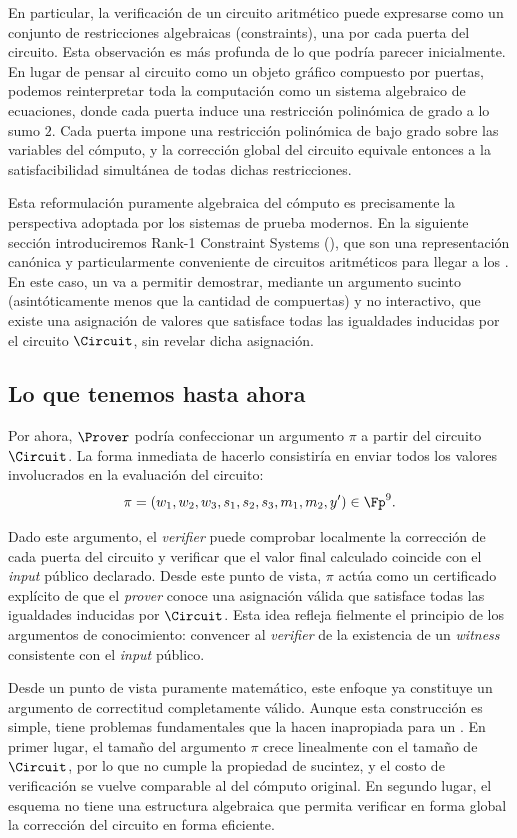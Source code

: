 En particular, la verificación de un circuito aritmético puede expresarse como un conjunto de restricciones algebraicas (constraints), una por cada puerta del circuito. Esta observación es más profunda de lo que podría parecer inicialmente. En lugar de pensar al circuito como un objeto gráfico compuesto por puertas, podemos reinterpretar toda la computación como un sistema algebraico de ecuaciones, donde cada puerta induce una restricción polinómica de grado a lo sumo $2$. Cada puerta impone una restricción polinómica de bajo grado sobre las variables del cómputo, y la corrección global del circuito equivale entonces a la satisfacibilidad simultánea de todas dichas restricciones.

Esta reformulación puramente algebraica del cómputo es precisamente la perspectiva adoptada por los sistemas de prueba modernos. En la siguiente sección introduciremos Rank-1 Constraint Systems (\ROneCS), que son una representación canónica y particularmente conveniente de circuitos aritméticos para llegar a los \SNARK. En este caso, un \SNARK va a permitir demostrar, mediante un argumento sucinto (asintóticamente menos que la cantidad de compuertas) y no interactivo, que existe una asignación de valores que satisface todas las igualdades inducidas por el circuito $\Circuit$, sin revelar dicha asignación.

\subsection{Lo que tenemos hasta ahora}

Por ahora, $\Prover$ podría confeccionar un argumento $\pi$ a partir del circuito $\Circuit$. La forma inmediata de hacerlo consistiría en enviar todos los valores involucrados en la evaluación del circuito:
$$\pi = (w_1, w_2, w_3, s_1, s_2, s_3, m_1, m_2, y') \in \Fp^9.$$

Dado este argumento, el \textit{verifier} puede comprobar localmente la corrección de cada puerta del circuito y verificar que el valor final calculado coincide con el \textit{input} público declarado. Desde este punto de vista, $\pi$ actúa como un certificado explícito de que el \textit{prover} conoce una asignación válida que satisface todas las igualdades inducidas por $\Circuit$. Esta idea refleja fielmente el principio de los argumentos de conocimiento: convencer al \textit{verifier} de la existencia de un \textit{witness} consistente con el \textit{input} público.

Desde un punto de vista puramente matemático, este enfoque ya constituye un argumento de correctitud completamente válido. Aunque esta construcción es simple, tiene problemas fundamentales que la hacen inapropiada para un \SNARK. En primer lugar, el tamaño del argumento $\pi$ crece linealmente con el tamaño de $\Circuit$, por lo que no cumple la propiedad de sucintez, y el costo de verificación se vuelve comparable al del cómputo original. En segundo lugar, el esquema no tiene una estructura algebraica que permita verificar en forma global la corrección del circuito en forma eficiente.

